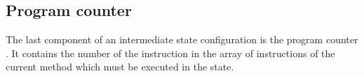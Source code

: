 \subsection{Program counter}\label{pc}
The last component of an intermediate state configuration is the program counter \pc. It contains the number of the instruction in the array of instructions
of the current method which must be executed in the state. 
